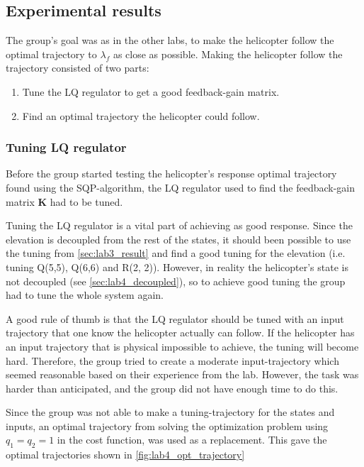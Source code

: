 \documentclass[../main.tex]{subfiles}
\begin{document}
\subsection{Experimental results}
The group's goal was as in the other labs, to make the helicopter follow the optimal trajectory to $ \lambda_f $ as close as possible. Making the helicopter follow the trajectory consisted of two parts: 
\begin{enumerate}
	\item Tune the LQ regulator to get a good feedback-gain matrix.
	\item Find an optimal trajectory the helicopter could follow.
\end{enumerate}

\subsubsection{Tuning LQ regulator}
Before the group started testing the helicopter's response optimal trajectory found using the SQP-algorithm, the LQ regulator used to find the feedback-gain matrix $\bm K$ had to be tuned. 

Tuning the LQ regulator is a vital part of achieving as good response. Since the elevation is decoupled from the rest of the states, it should been possible to use the tuning from \cref{sec:lab3_result} and find a good tuning for the elevation (i.e. tuning Q(5,5), Q(6,6) and R(2, 2)). However, in reality the helicopter's state is not decoupled (see \cref{sec:lab4_decoupled}), so to achieve good tuning the group had to tune the whole system again.

A good rule of thumb is that the LQ regulator should be tuned with an input trajectory that one know the helicopter actually can follow. If the helicopter has an input trajectory that is physical impossible to achieve, the tuning will become hard.  Therefore, the group tried to create a moderate input-trajectory which seemed reasonable based on their experience from the lab. However, the task was harder than anticipated, and the group did not have enough time to do this. 

Since the group was not able to make a tuning-trajectory for the states and inputs, an optimal trajectory from solving the optimization problem using $q_1 = q_2 = 1$ in the cost function, was used as a replacement. This gave the optimal trajectories shown in \cref{fig:lab4_opt_trajectory}
\end{document}
